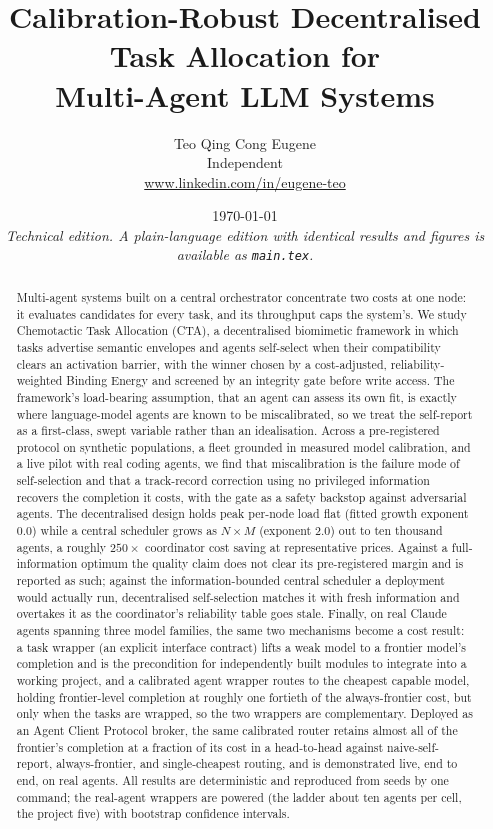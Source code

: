 \documentclass[11pt]{article}
\title{\bfseries Calibration-Robust Decentralised Task Allocation for\\ Multi-Agent LLM Systems}
\author{Teo Qing Cong Eugene\\ \small Independent \\ \small \href{https://www.linkedin.com/in/eugene-teo}{www.linkedin.com/in/eugene-teo}}
\date{\today\\[2pt] \small\itshape Technical edition. A plain-language edition with identical results and figures is available as \texttt{main.tex}.}
\begin{document}
\maketitle

\begin{abstract}
\noindent
Multi-agent systems built on a central orchestrator concentrate two costs at one node: it evaluates candidates for every task, and its throughput caps the system's. We study Chemotactic Task Allocation (CTA), a decentralised biomimetic framework in which tasks advertise semantic envelopes and agents self-select when their compatibility clears an activation barrier, with the winner chosen by a cost-adjusted, reliability-weighted Binding Energy and screened by an integrity gate before write access. The framework's load-bearing assumption, that an agent can assess its own fit, is exactly where language-model agents are known to be miscalibrated, so we treat the self-report as a first-class, swept variable rather than an idealisation. Across a pre-registered protocol on synthetic populations, a fleet grounded in measured model calibration, and a live pilot with real coding agents, we find that miscalibration is the failure mode of self-selection and that a track-record correction using no privileged information recovers the completion it costs, with the gate as a safety backstop against adversarial agents. The decentralised design holds peak per-node load flat (fitted growth exponent $0.0$) while a central scheduler grows as $N\times M$ (exponent $2.0$) out to ten thousand agents, a roughly $250\times$ coordinator cost saving at representative prices. Against a full-information optimum the quality claim does not clear its pre-registered margin and is reported as such; against the information-bounded central scheduler a deployment would actually run, decentralised self-selection matches it with fresh information and overtakes it as the coordinator's reliability table goes stale. Finally, on real Claude agents spanning three model families, the same two mechanisms become a cost result: a task wrapper (an explicit interface contract) lifts a weak model to a frontier model's completion and is the precondition for independently built modules to integrate into a working project, and a calibrated agent wrapper routes to the cheapest capable model, holding frontier-level completion at roughly one fortieth of the always-frontier cost, but only when the tasks are wrapped, so the two wrappers are complementary. Deployed as an Agent Client Protocol broker, the same calibrated router retains almost all of the frontier's completion at a fraction of its cost in a head-to-head against naive-self-report, always-frontier, and single-cheapest routing, and is demonstrated live, end to end, on real agents. All results are deterministic and reproduced from seeds by one command; the real-agent wrappers are powered (the ladder about ten agents per cell, the project five) with bootstrap confidence intervals.
\end{abstract}
\end{document}
